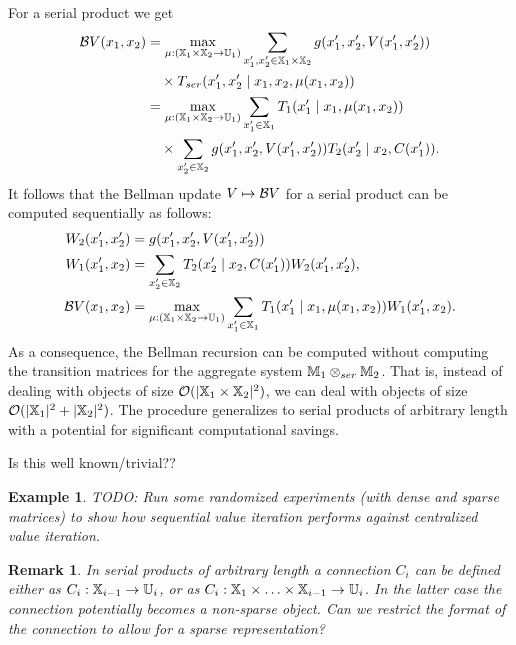 \documentclass[conference]{IEEEtran}
\newtheorem{remark}{Remark}
\newtheorem{example}{Example}
\newcommand{\red}[1]{{\color{red} #1 }}
\begin{document}
For a serial product we get
\begin{equation*}
\begin{aligned}
  \mathcal{B} V (x_1, x_2) & = \max_{\mu: (\mathbb{X}_1 \times \mathbb{X}_2 \rightarrow \mathbb{U}_1)} \sum_{x_1', x_2' \in \mathbb{X}_1 \times \mathbb{X}_2}  g(x_1', x_2', V(x_1', x_2')) \\
  & \quad \times T_{ser}(x_1', x_2' \mid x_1, x_2, \mu(x_1, x_2)) \\
  & = \max_{\mu: (\mathbb{X}_1 \times \mathbb{X}_2 \rightarrow \mathbb{U}_1)} \sum_{x_1' \in \mathbb{X}_1} T_1(x_1' \mid x_1, \mu(x_1, x_2)) \\
  & \quad \times \sum_{x_2' \in \mathbb{X}_2}  g(x_1', x_2', V(x_1', x_2')) T_2(x_2' \mid x_2, C(x_1')).
\end{aligned}
\end{equation*}
It follows that the Bellman update $V \mapsto \mathcal{B} V$ for a serial product can be computed sequentially as follows:
\begin{equation*}
\begin{aligned}
  W_2(x_1', x_2') & = g(x_1', x_2', V(x_1', x_2')) \\
  W_1(x_1', x_2) & = \sum_{x_2' \in \mathbb{X}_2}  T_2(x_2' \mid x_2, C(x_1')) W_2(x_1', x_2'), \\
  \mathcal{B} V(x_1, x_2) & = \max_{\mu: (\mathbb{X}_1 \times \mathbb{X}_2 \rightarrow \mathbb{U}_1)} \sum_{x_1' \in \mathbb{X}_1} T_1(x_1' \mid x_1, \mu(x_1, x_2)) W_1(x_1', x_2).
\end{aligned}
\end{equation*}
As a consequence, the Bellman recursion can be computed without computing the transition matrices for the aggregate system $\mathbb{M}_1 \otimes_{ser} \mathbb{M}_2$. That is, instead of dealing with objects of size $\mathcal O(| \mathbb{X}_1 \times \mathbb{X}_2 |^2)$, we can deal with objects of size $\mathcal O(|\mathbb{X}_1|^2 + |\mathbb{X}_2|^2)$. The procedure generalizes to serial products of arbitrary length with a potential for significant computational savings. 

\red{Is this well known/trivial??}

\begin{example}
  \red{TODO: Run some randomized experiments (with dense and sparse matrices) to show how sequential value iteration performs against centralized value iteration.}
\end{example}

\begin{remark}
  In serial products of arbitrary length a connection $C_i$ can be defined either as $C_i: \mathbb{X}_{i-1} \rightarrow \mathbb{U}_i$, or as $C_i: \mathbb{X}_1 \times \ldots \times \mathbb{X}_{i-1} \rightarrow \mathbb{U}_i$. In the latter case the connection potentially becomes a non-sparse object. \red{Can we restrict the format of the connection to allow for a sparse representation?}
\end{remark}
\end{document}
